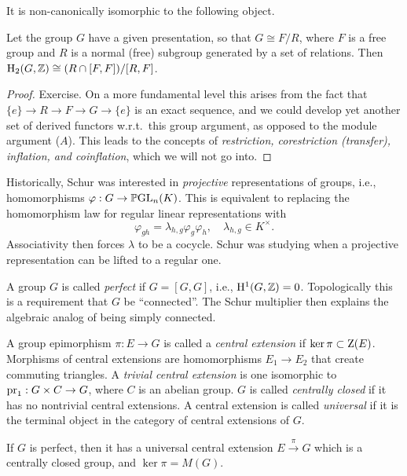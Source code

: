It is non-canonically isomorphic to the following object.

\begin{thm}
    Let the group $G$ have a given presentation, so that $G\cong F\slash R$, where $F$ is a free group and $R$ is a normal (free) subgroup generated by a set of relations. Then $\mathrm{H}_2(G,\mathbb{Z})\cong (R\cap [F,F])\slash [R,F]$.
\end{thm}
\begin{proof}
    Exercise. On a more fundamental level this arises from the fact that $\{e\}\to R\to F\to G\to \{e\}$ is an exact sequence, and we could develop yet another set of derived functors w.r.t.\ this group argument, as opposed to the module argument ($A$). This leads to the concepts of \emph{restriction, corestriction (transfer), inflation, and coinflation}, which we will not go into.
\end{proof}

Historically, Schur was interested in \emph{projective} representations of groups, i.e., homomorphisms $\varphi:G\to \operatorname{\mathbb{P}GL}_n(K)$. This is equivalent to replacing the homomorphism law for regular linear representations with
\[\varphi_{gh}=\lambda_{h,g}\varphi_g\varphi_h,\quad\lambda_{h,g}\in K^\times.\]
Associativity then forces $\lambda$ to be a cocycle. Schur was studying when a projective representation can be lifted to a regular one. 

A group $G$ is called \emph{perfect} if $G=[G,G]$, i.e., $\mathrm{H}^1(G,\mathbb{Z})=0$. Topologically this is a requirement that $G$ be ``connected''. The Schur multiplier then explains the algebraic analog of being simply connected. 

\begin{defn}
    A group epimorphism $\pi:E\to G$ is called a \emph{central extension} if $\ker\pi\subset \mathrm{Z}(E)$.  Morphisms of central extensions are homomorphisms $E_1\to E_2$ that create commuting triangles. A \emph{trivial central extension} is one isomorphic to $\operatorname{pr}_1:G\times C\to G$, where $C$ is an abelian group. $G$ is called \emph{centrally closed} if it has no nontrivial central extensions. A central extension is called \emph{universal} if it is the terminal object in the category of central extensions of $G$.
\end{defn}

\begin{thm}[Schur]
    If $G$ is perfect, then it has a universal central extension $E\overset{\pi}{\to} G$ which is a centrally closed group, and $\ker\pi =M(G)$.
\end{thm}

